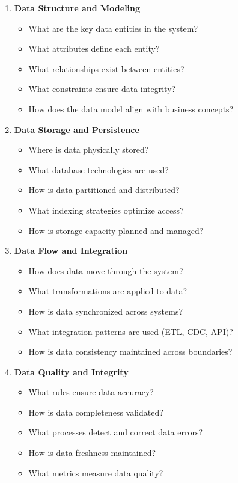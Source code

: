 \documentclass[11pt,letterpaper]{article}
\begin{document}
\begin{enumerate}[label=\textbf{C\arabic*:}, leftmargin=2.5em]
    \item \textbf{Data Structure and Modeling}
    \begin{itemize}[nosep]
        \item What are the key data entities in the system?
        \item What attributes define each entity?
        \item What relationships exist between entities?
        \item What constraints ensure data integrity?
        \item How does the data model align with business concepts?
    \end{itemize}
    
    \item \textbf{Data Storage and Persistence}
    \begin{itemize}[nosep]
        \item Where is data physically stored?
        \item What database technologies are used?
        \item How is data partitioned and distributed?
        \item What indexing strategies optimize access?
        \item How is storage capacity planned and managed?
    \end{itemize}
    
    \item \textbf{Data Flow and Integration}
    \begin{itemize}[nosep]
        \item How does data move through the system?
        \item What transformations are applied to data?
        \item How is data synchronized across systems?
        \item What integration patterns are used (ETL, CDC, API)?
        \item How is data consistency maintained across boundaries?
    \end{itemize}
    
    \item \textbf{Data Quality and Integrity}
    \begin{itemize}[nosep]
        \item What rules ensure data accuracy?
        \item How is data completeness validated?
        \item What processes detect and correct data errors?
        \item How is data freshness maintained?
        \item What metrics measure data quality?
    \end{itemize}
    

\end{enumerate}
\end{document}
